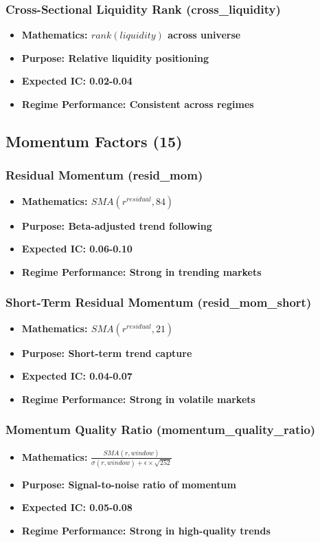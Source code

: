 \documentclass[11pt,letterpaper,openany]{book}
\begin{document}
\subsubsection{Cross-Sectional Liquidity Rank (cross\_liquidity)}
\begin{itemize}
    \item \textbf{Mathematics: $rank(liquidity)$ across universe}
    \item \textbf{Purpose: Relative liquidity positioning}
    \item \textbf{Expected IC: 0.02-0.04}
    \item \textbf{Regime Performance: Consistent across regimes}
\end{itemize}

\subsection{Momentum Factors (15)}

\subsubsection{Residual Momentum (resid\_mom)}
\begin{itemize}
    \item \textbf{Mathematics: $SMA(r^{residual}, 84)$}
    \item \textbf{Purpose: Beta-adjusted trend following}
    \item \textbf{Expected IC: 0.06-0.10}
    \item \textbf{Regime Performance: Strong in trending markets}
\end{itemize}

\subsubsection{Short-Term Residual Momentum (resid\_mom\_short)}
\begin{itemize}
    \item \textbf{Mathematics: $SMA(r^{residual}, 21)$}
    \item \textbf{Purpose: Short-term trend capture}
    \item \textbf{Expected IC: 0.04-0.07}
    \item \textbf{Regime Performance: Strong in volatile markets}
\end{itemize}

\subsubsection{Momentum Quality Ratio (momentum\_quality\_ratio)}
\begin{itemize}
    \item \textbf{Mathematics:} $\frac{SMA(r, window)}{\sigma(r, window) + \epsilon \times \sqrt{252}}$
    \item \textbf{Purpose: Signal-to-noise ratio of momentum}
    \item \textbf{Expected IC: 0.05-0.08}
    \item \textbf{Regime Performance: Strong in high-quality trends}
\end{itemize}
\end{document}
